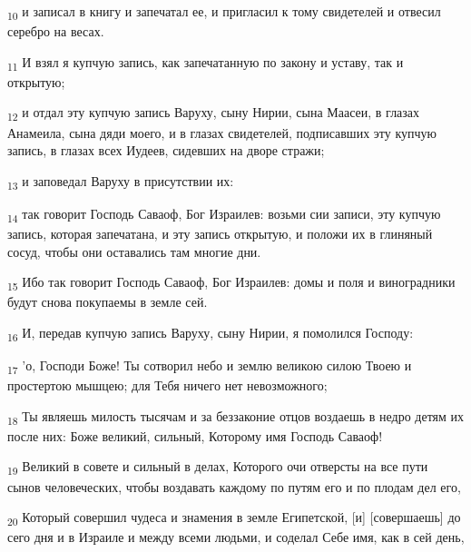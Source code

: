 \begin{tcolorbox}
\textsubscript{10} и записал в книгу и запечатал ее, и пригласил к тому свидетелей и отвесил серебро на весах.
\end{tcolorbox}
\begin{tcolorbox}
\textsubscript{11} И взял я купчую запись, как запечатанную по закону и уставу, так и открытую;
\end{tcolorbox}
\begin{tcolorbox}
\textsubscript{12} и отдал эту купчую запись Варуху, сыну Нирии, сына Маасеи, в глазах Анамеила, сына дяди моего, и в глазах свидетелей, подписавших эту купчую запись, в глазах всех Иудеев, сидевших на дворе стражи;
\end{tcolorbox}
\begin{tcolorbox}
\textsubscript{13} и заповедал Варуху в присутствии их:
\end{tcolorbox}
\begin{tcolorbox}
\textsubscript{14} так говорит Господь Саваоф, Бог Израилев: возьми сии записи, эту купчую запись, которая запечатана, и эту запись открытую, и положи их в глиняный сосуд, чтобы они оставались там многие дни.
\end{tcolorbox}
\begin{tcolorbox}
\textsubscript{15} Ибо так говорит Господь Саваоф, Бог Израилев: домы и поля и виноградники будут снова покупаемы в земле сей.
\end{tcolorbox}
\begin{tcolorbox}
\textsubscript{16} И, передав купчую запись Варуху, сыну Нирии, я помолился Господу:
\end{tcolorbox}
\begin{tcolorbox}
\textsubscript{17} 'о, Господи Боже! Ты сотворил небо и землю великою силою Твоею и простертою мышцею; для Тебя ничего нет невозможного;
\end{tcolorbox}
\begin{tcolorbox}
\textsubscript{18} Ты являешь милость тысячам и за беззаконие отцов воздаешь в недро детям их после них: Боже великий, сильный, Которому имя Господь Саваоф!
\end{tcolorbox}
\begin{tcolorbox}
\textsubscript{19} Великий в совете и сильный в делах, Которого очи отверсты на все пути сынов человеческих, чтобы воздавать каждому по путям его и по плодам дел его,
\end{tcolorbox}
\begin{tcolorbox}
\textsubscript{20} Который совершил чудеса и знамения в земле Египетской, [и] [совершаешь] до сего дня и в Израиле и между всеми людьми, и соделал Себе имя, как в сей день,
\end{tcolorbox}
